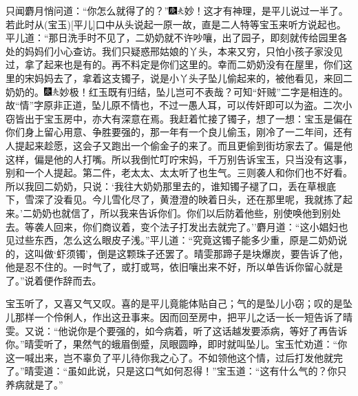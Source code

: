 只闻麝月悄问道：``你怎么就得了的？''{\includegraphics[width=3mm]{../Images/00004}\includegraphics[width=3mm]{../Images/00012}\footnotesize \kaishu 妙！这才有神理，是平儿说过一半了。若此时从{(宝玉)}{[}平儿{]}口中从头说起一原一故，直是二人特等宝玉来听方说起也。}平儿道：``那日洗手时不见了，二奶奶就不许吵嚷，出了园子，即刻就传给园里各处的妈妈们小心查访。我们只疑惑邢姑娘的丫头，本来又穷，只怕小孩子家没见过，拿了起来也是有的。再不料定是你们这里的。幸而二奶奶没有在屋里，你们这里的宋妈妈去了，拿着这支镯子，说是小丫头子坠儿偷起来的，被他看见，来回二奶奶的。{\includegraphics[width=3mm]{../Images/00004}\includegraphics[width=3mm]{../Images/00012}\footnotesize \kaishu 妙极！红玉既有归结，坠儿岂可不表哉？可知``奸贼''二字是相连的。故``情''字原非正道，坠儿原不情也，不过一愚人耳，可以传奸即可以为盗。二次小窃皆出于宝玉房中，亦大有深意在焉。}我赶着忙接了镯子，想了一想：宝玉是偏在你们身上留心用意、争胜要强的，那一年有一个良儿偷玉，刚冷了一二年间，还有人提起来趁愿，这会子又跑出一个偷金子的来了。而且更偷到街坊家去了。偏是他这样，偏是他的人打嘴。所以我倒忙叮咛宋妈，千万别告诉宝玉，只当没有这事，别和一个人提起。第二件，老太太、太太听了也生气。三则袭人和你们也不好看。所以我回二奶奶，只说：`我往大奶奶那里去的，谁知镯子褪了口，丢在草根底下，雪深了没看见。今儿雪化尽了，黄澄澄的映着日头，还在那里呢，我就拣了起来。'二奶奶也就信了，所以我来告诉你们。你们以后防着他些，别使唤他到别处去。等袭人回来，你们商议着，变个法子打发出去就完了。''麝月道：``这小娼妇也见过些东西，怎么这么眼皮子浅。''平儿道：``究竟这镯子能多少重，原是二奶奶说的，这叫做`虾须镯'，倒是这颗珠子还罢了。晴雯那蹄子是块爆炭，要告诉了他，他是忍不住的。一时气了，或打或骂，依旧嚷出来不好，所以单告诉你留心就是了。''说着便作辞而去。

宝玉听了，又喜又气又叹。喜的是平儿竟能体贴自己；气的是坠儿小窃；叹的是坠儿那样一个伶俐人，作出这丑事来。因而回至房中，把平儿之话一长一短告诉了晴雯。又说：``他说你是个要强的，如今病着，听了这话越发要添病，等好了再告诉你。''晴雯听了，果然气的蛾眉倒蹙，凤眼圆睁，即时就叫坠儿。宝玉忙劝道：``你这一喊出来，岂不辜负了平儿待你我之心了。不如领他这个情，过后打发他就完了。''晴雯道：``虽如此说，只是这口气如何忍得！''宝玉道：``这有什么气的？你只养病就是了。''

